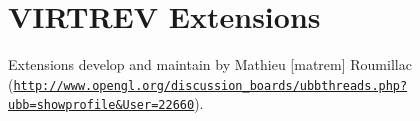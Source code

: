 \hypertarget{group__virtrev}{
\section{VIRTREV Extensions}
\label{group__virtrev}
}
Extensions develop and maintain by Mathieu \mbox{[}matrem\mbox{]} Roumillac (\href{http://www.opengl.org/discussion_boards/ubbthreads.php?ubb=showprofile&User=22660}{\tt http://www.opengl.org/discussion\_\-boards/ubbthreads.php?ubb=showprofile\&User=22660}).  
